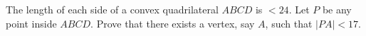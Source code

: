 The length of each side of a convex quadrilateral $ABCD$ is $< 24$. Let $P$ be any point inside $ABCD$. Prove that there exists a vertex, say $A$, such that $|PA| < 17$.
